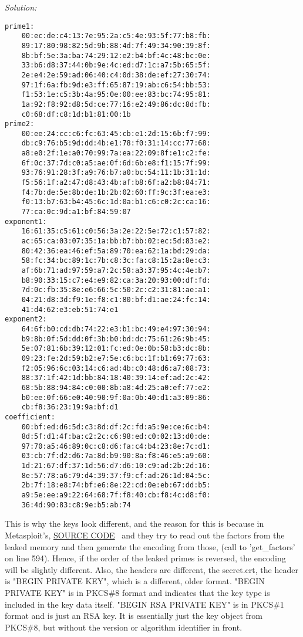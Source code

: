 \documentclass[a4paper,11pt]{article}
\newenvironment{solution}%
{\par{\noindent\small\textit{Solution:}}\vspace{-12pt}\begin{framed}}%
{\end{framed}\par}
\begin{document}
\begin{solution}
\begin{verbatim}
prime1:
    00:ec:de:c4:13:7e:95:2a:c5:4e:93:5f:77:b8:fb:
    89:17:80:98:82:5d:9b:88:4d:7f:49:34:90:39:8f:
    8b:bf:5e:3a:ba:74:29:12:e2:b4:bf:4c:48:bc:0e:
    33:b6:d8:37:44:0b:9e:4c:ed:d7:1c:a7:5b:65:5f:
    2e:e4:2e:59:ad:06:40:c4:0d:38:de:ef:27:30:74:
    97:1f:6a:fb:9d:e3:ff:65:87:19:ab:c6:54:bb:53:
    f1:53:1e:c5:3b:4a:95:0e:00:ee:83:bc:74:95:81:
    1a:92:f8:92:d8:5d:ce:77:16:e2:49:86:dc:8d:fb:
    c0:68:df:c8:1d:b1:81:00:1b
prime2:
    00:ee:24:cc:c6:fc:63:45:cb:e1:2d:15:6b:f7:99:
    db:c9:76:b5:9d:dd:4b:e1:78:f0:31:14:cc:77:68:
    a8:e0:2f:1e:a0:70:99:7a:ea:22:09:8f:e1:c2:fe:
    6f:0c:37:7d:c0:a5:ae:0f:6d:6b:e8:f1:15:7f:99:
    93:76:91:28:3f:a9:76:b7:a0:bc:54:11:1b:31:1d:
    f5:56:1f:a2:47:d8:43:4b:af:b8:6f:a2:b8:84:71:
    f4:7b:de:5e:8b:de:1b:2b:02:60:ff:9c:3f:ea:e3:
    f0:13:b7:63:b4:45:6c:1d:0a:b1:c6:c0:2c:ca:16:
    77:ca:0c:9d:a1:bf:84:59:07
exponent1:
    16:61:35:c5:61:c0:56:3a:2e:22:5e:72:c1:57:82:
    ac:65:ca:03:07:35:1a:bb:b7:bb:02:ec:5d:83:e2:
    80:42:36:ea:46:ef:5a:89:70:ea:62:1a:bd:29:da:
    58:fc:34:bc:89:1c:7b:c8:3c:fa:c8:15:2a:8e:c3:
    af:6b:71:ad:97:59:a7:2c:58:a3:37:95:4c:4e:b7:
    b8:90:33:15:c7:e4:e9:82:ca:3a:20:93:00:df:fd:
    7d:0c:fb:35:8e:e6:66:5c:50:2c:c2:31:81:ae:a1:
    04:21:d8:3d:f9:1e:f8:c1:80:bf:d1:ae:24:fc:14:
    41:d4:62:e3:eb:51:74:e1
exponent2:
    64:6f:b0:cd:db:74:22:e3:b1:bc:49:e4:97:30:94:
    b9:8b:0f:5d:dd:0f:3b:b0:bd:dc:75:61:26:9b:45:
    5e:07:81:6b:39:12:01:fc:ed:0e:0b:58:b3:dc:8b:
    09:23:fe:2d:59:b2:e7:5e:c6:bc:1f:b1:69:77:63:
    f2:05:96:6c:03:14:c6:ad:4b:c0:48:d6:a7:08:73:
    88:37:1f:42:1d:bb:84:18:40:39:14:ef:ad:2c:42:
    68:5b:88:94:84:c0:00:8b:a8:4d:25:a0:ef:77:e2:
    b0:ee:0f:66:e0:40:90:9f:0a:0b:40:d1:a3:09:86:
    cb:f8:36:23:19:9a:bf:d1
coefficient:
    00:bf:ed:d6:5d:c3:8d:df:2c:fd:a5:9e:ce:6c:b4:
    8d:5f:d1:4f:ba:c2:2c:c6:98:ed:c0:02:13:d0:de:
    97:70:a5:46:89:0c:c8:d6:fa:c4:b4:23:8e:7c:d1:
    03:cb:7f:d2:d6:7a:8d:b9:90:8a:f8:46:e5:a9:60:
    1d:21:67:df:37:1d:56:d7:d6:10:c9:ad:2b:2d:16:
    8e:57:78:a6:79:d4:39:37:f9:cf:ad:26:1d:04:5c:
    2b:7f:18:e8:74:bf:e6:8e:22:cd:0e:eb:67:dd:b5:
    a9:5e:ee:a9:22:64:68:7f:f8:40:cb:f8:4c:d8:f0:
    36:4d:90:83:c8:9e:b5:ab:74   
\end{verbatim}

This is why the keys look different, and the reason for this is because in Metasploit's, \href{https://github.com/rapid7/metasploit-framework/blob/master//modules/auxiliary/scanner/ssl/openssl_heartbleed.rb}{SOURCE CODE}~\cite{web1} and they try to read out the factors from the leaked memory and then generate the encoding from those, (call to 'get\_factors' on line 594). Hence, if the order of the leaked primes is reversed, the encoding will be slightly different. Also, the headers are different, the secret.crt, the header is "BEGIN PRIVATE KEY", which is a different, older format. "BEGIN PRIVATE KEY" is in PKCS\#8 format and indicates that the key type is included in the key data itself. "BEGIN RSA PRIVATE KEY" is in PKCS\#1 format and is just an RSA key. It is essentially just the key object from PKCS\#8, but without the version or algorithm identifier in front.


\end{solution}
\end{document}
